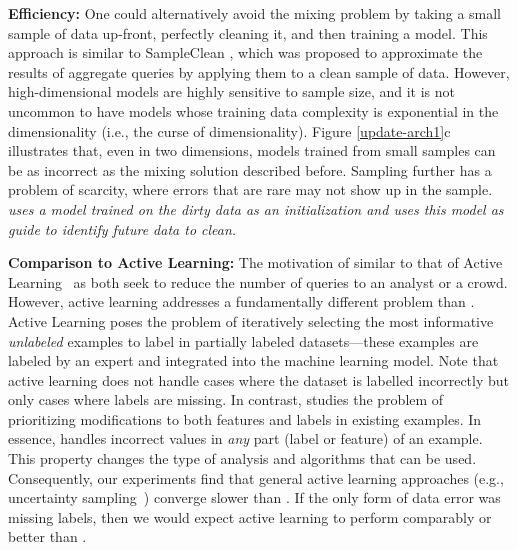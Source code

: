 \vspace{0.5em}
\noindent \textbf{Efficiency: } One could alternatively avoid the mixing problem by taking a small sample of data up-front, perfectly cleaning it, and then training a model.
This approach is similar to SampleClean \cite{wang1999sample}, which was proposed to approximate the results of aggregate queries by applying them to a clean sample of data.
However, high-dimensional models are highly sensitive to sample size, and it is not uncommon to have models whose training data complexity is exponential in the dimensionality (i.e., the curse of dimensionality).
Figure \ref{update-arch1}c illustrates that, even in two dimensions, models trained from small samples can be as incorrect as the mixing solution described before.
Sampling further has a problem of scarcity, where errors that are rare may not show up in the sample.
\emph{\sys uses a model trained on the dirty data as an initialization and uses this model as guide to identify future data to clean.}

\vspace{0.5em}
\noindent \textbf{Comparison to Active Learning: } The motivation of \sys similar to that of Active Learning~\cite{DBLP:journals/pvldb/YakoutENOI11,gokhale2014corleone} as both seek to reduce the number of queries to an analyst or a crowd.
However, active learning addresses a fundamentally different problem than \sys.
Active Learning poses the problem of iteratively selecting the most informative {\it unlabeled} examples to label in partially labeled datasets---these
examples are labeled by an expert and integrated into the machine learning model.
Note that active learning does not handle cases where the dataset is labelled incorrectly but only cases where labels are missing.
In contrast, \sys studies the problem of prioritizing modifications to both features and labels in existing examples.
In essence, \sys handles incorrect values in {\it any} part (label or feature) of an example.
This property changes the type of analysis and algorithms that can be used.
Consequently, our experiments find that general active learning approaches (e.g., uncertainty sampling~\cite{settles2010active}) converge slower than \sys. 
If the only form of data error was missing labels, then we would expect active learning to perform comparably or better than \sys.





